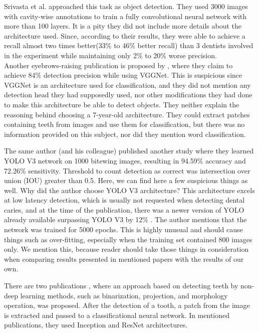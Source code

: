 Srivasta et al. \cite{Srivastava2017} approached this task as object detection. They used 3000 images with cavity-wise annotations to train a fully convolutional neural network with more than 100 layers. It is a pity they did not include more details about the architecture used. Since, according to their results, they were able to achieve a recall almost two times better(33\% to 46\% better recall) than 3 dentists involved in the experiment while maintaining only 2\% to 20\% worse precision. \\

Another eyebrows-raising publication is proposed by \cite{Bayrakdar2021}, where they claim to achieve 84\% detection precision while using VGGNet. This is suspicious since VGGNet is an architecture used for classification, and they did not mention any detection head they had supposedly used, nor other modifications they had done to make this architecture be able to detect objects. They neither explain the reasoning behind choosing a 7-year-old architecture. They could extract patches containing teeth from images and use them for classification, but there was no information provided on this subject, nor did they mention word classification.

The same author (and his colleague) published another study \cite{Bayraktar2021} where they learned YOLO V3 network on 1000 bitewing images, resulting in 94.59\% accuracy and 72.26\% sensitivity. Threshold to count detection as correct was intersection over union (IOU) greater than 0.5. Here, we can find here a few suspicious things as well. Why did the author choose YOLO V3  \cite{Redmon2018} architecture? This architecture excels at low latency detection, which is usually not requested when detecting dental caries, and at the time of the publication, there was a newer version of YOLO already available surpassing YOLO V3 by 12\% \cite{Bochovskiy2020}. The author mentions that the network was trained for 5000 epochs. This is highly unusual and should cause things such as over-fitting, especially when the training set contained 800 images only. We mention this, because reader should take those things in consideration when comparing results presented in mentioned papers with the results of our own.

There are two publications \cite{Mao2021, Moran2021}, where an approach based on detecting teeth by non-deep learning methods, such as binarization, projection, and morphology operation, was proposed. After the detection of a tooth, a patch from the image is extracted and passed to a classificational neural network. In mentioned publications, they used Inception and ResNet architectures.